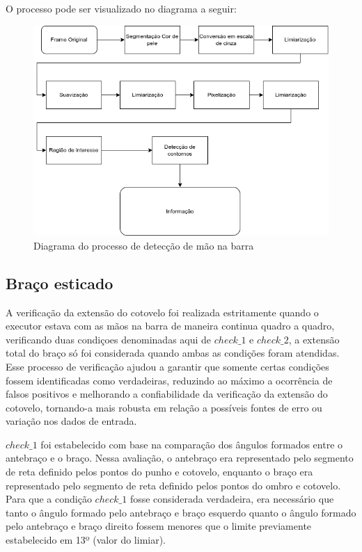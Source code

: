 O processo pode ser visualizado no diagrama a seguir:
\begin{figure}[!htb]
	\centering
	\includegraphics[scale=0.7]{figuras/diagrama/mao_barra.png}
	\caption{Diagrama do processo de detecção de mão na barra}
	\label{dia:mao_barra}
\end{figure}

\subsection[Braço esticado]{Braço esticado}\label{sec:Braco esticado}

A verificação da extensão do cotovelo foi realizada estritamente quando o executor estava com as mãos na barra de maneira continua quadro a quadro, verificando duas condiçoes denominadas aqui de $check\_1$ e $check\_2$, a extensão total do braço só foi considerada quando ambas as condições foram atendidas. Esse processo de verificação ajudou a garantir que somente certas condições fossem identificadas como verdadeiras, reduzindo ao máximo a ocorrência de falsos positivos e melhorando a confiabilidade da verificação da extensão do cotovelo, tornando-a mais robusta em relação a possíveis fontes de erro ou variação nos dados de entrada.


$check\_1$ foi estabelecido com base na comparação dos ângulos formados entre o antebraço e o braço. Nessa avaliação, o antebraço era representado pelo segmento de reta definido pelos pontos do punho e cotovelo, enquanto o braço era representado pelo segmento de reta definido pelos pontos do ombro e cotovelo. Para que a condição $check\_1$ fosse considerada verdadeira, era necessário que tanto o ângulo formado pelo antebraço e braço esquerdo quanto o ângulo formado pelo antebraço e braço direito fossem menores que o limite previamente estabelecido em 13º (valor do limiar).\label{angulo_braco}

